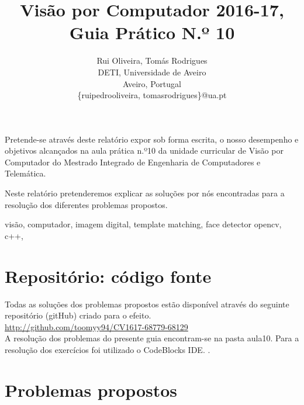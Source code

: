 \documentclass[portuguese, times, mirror]{revdetua}
\begin{document}

\title{Visão por Computador 2016-17, Guia Prático N.º 10}
\author{Rui Oliveira, Tomás Rodrigues\\ DETI, Universidade de Aveiro \\ Aveiro, Portugal \\ \{ruipedrooliveira, tomasrodrigues\}@ua.pt}
\maketitle

\begin{resumo}


Pretende-se através deste relatório expor sob forma escrita, o nosso desempenho e objetivos alcançados na aula prática n.º10 da unidade curricular de Visão por Computador do Mestrado Integrado de Engenharia de Computadores e Telemática.

Neste relatório pretenderemos explicar as soluções por nós encontradas para a resolução dos diferentes problemas propostos.


\end{resumo} 

\begin{palavraschave} %
visão, computador, imagem digital, template matching, face detector opencv, c++, 
 \end{palavraschave} %


\section{Repositório: código fonte}


Todas as soluções dos problemas propostos estão disponível através do seguinte repositório (gitHub) criado para o efeito. \\

\href{http://github.com/toomyy94/CV1617-68779-68129}{http://github.com/toomyy94/CV1617-68779-68129}
\\


A resolução dos problemas do presente guia encontram-se na pasta aula10. Para a resolução dos exercícios foi utilizado o CodeBlocks IDE. . 



\section{Problemas propostos}
\end{document}
